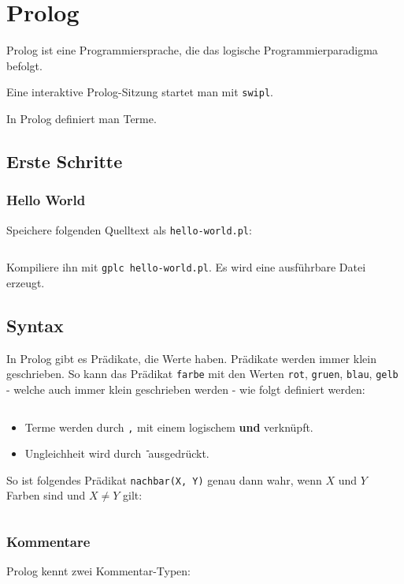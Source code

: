 \chapter{Prolog}

Prolog ist eine Programmiersprache, die das logische Programmierparadigma
befolgt.

Eine interaktive Prolog-Sitzung startet man mit \texttt{swipl}.

In Prolog definiert man Terme.
\section{Erste Schritte}
\subsection{Hello World}
Speichere folgenden Quelltext als \texttt{hello-world.pl}:
\inputminted[linenos, numbersep=5pt, tabsize=4, frame=lines, label=hello-world.hs]{prolog}{scripts/prolog/hello-world.pl}

Kompiliere ihn mit \texttt{gplc hello-world.pl}. Es wird eine
ausführbare Datei erzeugt.

\section{Syntax}
In Prolog gibt es Prädikate, die Werte haben. Prädikate werden immer klein geschrieben.
So kann das Prädikat \texttt{farbe} mit den Werten \texttt{rot}, \texttt{gruen},
\texttt{blau}, \texttt{gelb} - welche auch immer klein geschrieben werden - wie
folgt definiert werden:

\inputminted[numbersep=5pt, tabsize=4]{prolog}{scripts/prolog/praedikat-farbe.pl}

\begin{itemize}
    \item Terme werden durch \texttt{,} mit einem logischem \textbf{und} verknüpft.
    \item Ungleichheit wird durch \texttt{\=} ausgedrückt.
\end{itemize}

So ist folgendes Prädikat \texttt{nachbar(X, Y)} genau dann wahr, wenn $X$
und $Y$ Farben sind und $X \neq Y$ gilt:

\inputminted[numbersep=5pt, tabsize=4]{prolog}{scripts/prolog/simple-term.pl}

\subsection{Kommentare}
Prolog kennt zwei Kommentar-Typen:

